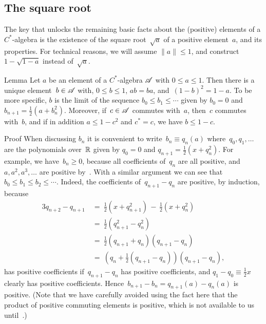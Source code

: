 \documentclass[a]{subfiles}
\begin{document}
\subsection{The square root}
\begin{parsec}%
\begin{point}%
The key that unlocks the remaining basic facts 
about the (positive) elements of a  $C^*$-algebra
is the existence of the square root~$\sqrt{a}$ of a positive element~$a$,
and its properties.
For technical reasons,
we will assume $\|a\|\leq 1$,
and construct
 $1-\sqrt{1-a}$ instead of~$\sqrt{a}$.
\end{point}
\begin{point}{Lemma}%
Let $a$ be an element of a $C^*$-algebra $\mathscr{A}$
with $0\leq a\leq 1$.
Then there is a unique element~$b\in\mathscr{A}$ 
with, $0\leq b\leq 1$,
$ab=ba$,
and~$(1-b)^2 = 1-a$.
To be more specific,
$b$ is the limit of
the sequence $b_0\leq b_1\leq \dotsb$
given by $b_0=0$ and $b_{n+1} = \frac{1}{2}(a+b_n^2)$.
Moreover,
if~$c\in\mathscr{A}$ commutes with~$a$, then~$c$ commutes with~$b$,
and if in addition $a\leq 1-c^2$ and $c^*=c$,
we have $b\leq 1-c$.
\begin{point}{Proof}%
When discussing $b_n$ it 
is convenient to write~$b_n \equiv q_n(a)$
where~$q_0,q_1,\dotsc$ are the polynomials over~$\mathbb{R}$ given by
$q_0=0$ and $q_{n+1}=\frac{1}{2}(x + q_n^2)$.
For example,
we have~$b_n\geq 0$, 
because all coefficients of~$q_n$ are all positive,
and $a,a^2,a^3,\dotsc$ are positive by~.
With a similar argument we can see that
 $b_0 \leq b_1\leq b_2\leq \dotsb$.
Indeed, 
the coefficients of~$q_{n+1}-q_n$
are positive,
by induction,
because
\begin{alignat*}{3}
q_{n+2}-q_{n+1} \ &=\ \textstyle \frac{1}{2}(x+ q_{n+1}^2)
\,-\, \textstyle\frac{1}{2}(x+q_n^2) \\
&=\ \textstyle\frac{1}{2}(q_{n+1}^2- q_n^2) \\
&=\ \textstyle\frac{1}{2}(q_{n+1}+q_n)(q_{n+1}-q_n) \\
&=\ (q_n+\textstyle\frac{1}{2}(q_{n+1}-q_n))(q_{n+1}-q_n),
\end{alignat*}
has positive coefficients
if~$q_{n+1}-q_n$ has positive coefficients,
and $q_1-q_0\equiv \frac{1}{2}x$ clearly has positive coefficients.
Hence~$b_{n+1}-b_{n} = q_{n+1}(a)- q_n(a)$ is positive.
(Note that we have carefully avoided
using the fact here that the product of positive 
commuting elements is positive,
which is not available to us until~.)


\end{point}
\end{point}
\end{parsec}
\end{document}
